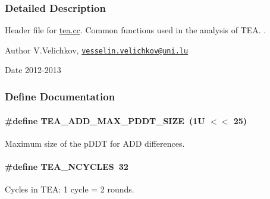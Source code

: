 \subsubsection{\-Detailed \-Description}
\-Header file for \hyperlink{tea_8cc}{tea.\-cc}. \-Common functions used in the analysis of \-T\-E\-A. . \begin{DoxyAuthor}{\-Author}
\-V.\-Velichkov, \href{mailto:vesselin.velichkov@uni.lu}{\tt vesselin.\-velichkov@uni.\-lu} 
\end{DoxyAuthor}
\begin{DoxyDate}{\-Date}
2012-\/2013 
\end{DoxyDate}


\subsubsection{\-Define \-Documentation}
\hypertarget{tea_8hh_a519acd40ae204e05f82d8ad7116a2843}{
\paragraph[{\-T\-E\-A\-\_\-\-A\-D\-D\-\_\-\-M\-A\-X\-\_\-\-P\-D\-D\-T\-\_\-\-S\-I\-Z\-E}]{\setlength{\rightskip}{0pt plus 5cm}\#define {\bf \-T\-E\-A\-\_\-\-A\-D\-D\-\_\-\-M\-A\-X\-\_\-\-P\-D\-D\-T\-\_\-\-S\-I\-Z\-E}~(1\-U $<$$<$ 25)}}\label{tea_8hh_a519acd40ae204e05f82d8ad7116a2843}
\-Maximum size of the p\-D\-D\-T for \-A\-D\-D differences. \hypertarget{tea_8hh_a731ff0e924a27e36c0f7bc72a7d383c5}{
\paragraph[{\-T\-E\-A\-\_\-\-N\-C\-Y\-C\-L\-E\-S}]{\setlength{\rightskip}{0pt plus 5cm}\#define {\bf \-T\-E\-A\-\_\-\-N\-C\-Y\-C\-L\-E\-S}~32}}\label{tea_8hh_a731ff0e924a27e36c0f7bc72a7d383c5}
\-Cycles in \-T\-E\-A\-: 1 cycle = 2 rounds. 

